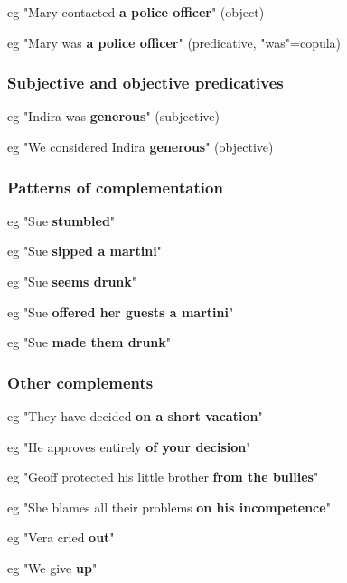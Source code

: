 eg "Mary contacted \textbf{a police officer}" (object)

eg "Mary was \textbf{a police officer}" (predicative, "was"=copula)

\subsubsection{Subjective and objective predicatives}

eg "Indira was \textbf{generous}" (subjective)

eg "We considered Indira \textbf{generous}" (objective)

\subsubsection{Patterns of complementation}


eg "Sue \textbf{stumbled}"


eg "Sue \textbf{sipped a martini}"


eg "Sue \textbf{seems drunk}"


eg "Sue \textbf{offered her guests a martini}"


eg "Sue \textbf{made them drunk}"

\subsubsection{Other complements}


eg "They have decided \textbf{on a short vacation}"

eg "He approves entirely \textbf{of your decision}"

eg "Geoff protected his little brother \textbf{from the bullies}"

eg "She blames all their problems \textbf{on his incompetence}"


eg "Vera cried \textbf{out}"

eg "We give \textbf{up}"

